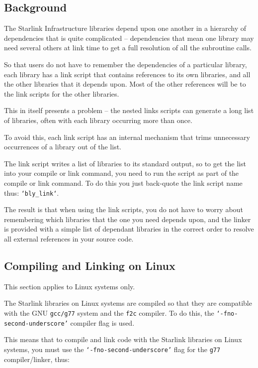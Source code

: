 \documentclass[twoside,11pt]{article}
\newcommand{\xlabel}[1]{}
\begin{document}
\subsection{\xlabel{link_scripts_background}Background}
\label{link_scripts_background}

The Starlink Infrastructure libraries depend upon one another in a
hierarchy of dependencies that is quite complicated -- dependencies that
mean one library may need several others at link time to get a full
resolution of all the subroutine calls.

So that users do not have to remember the dependencies of a particular
library, each library has a link script that contains references
to its own libraries, and all the other libraries that it depends upon.
Most of the other references will be to the link scripts for the other
libraries.

This in itself presents a problem -- the nested links scripts can
generate a long list of libraries, often with each library occurring more
than once.

To avoid this, each link script has an internal mechanism that trims
unnecessary occurrences of a library out of the list.

The link script writes a list of libraries to its standard output, so
to get the list into your compile or link command, you need to run the
script as part of the compile or link command.  To do this you just
back-quote the link script name thus: \texttt{`bly\_link`}.

The result is that when using the link scripts, you do not have to worry
about remembering which libraries that the one you need depends upon, and
the linker is provided with a simple list of dependant libraries in the
correct order to resolve all external references in your source code.

\subsection{\xlabel{compiling_and_linking_on_liunux}Compiling and Linking on Linux}
\label{compiling_and_linking_on_liunux}

This section applies to Linux systems only.

The Starlink libraries on Linux systems are compiled so that they are
compatible with the GNU \texttt{gcc/g77} system and the \texttt{f2c}
compiler.  To do this, the \texttt{`-fno-second-underscore'} compiler
flag is used.

This means that to compile and link code with the Starlink libraries
on Linux systems, you must use the \texttt{`-fno-second-underscore'}
flag for the \texttt{g77} compiler/linker, thus:
\end{document}
